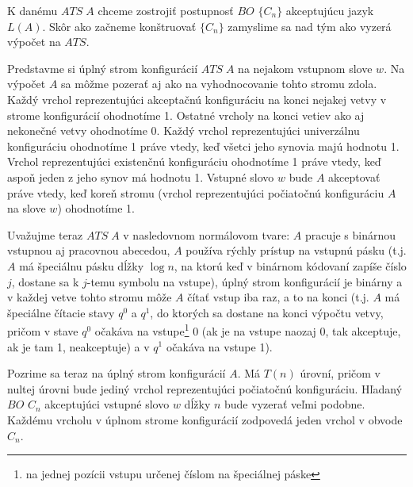 {\begin{dokaz}
  K danému $ATS\;A$ chceme zostrojiť postupnosť $BO$ $\{ C_n\}$
  akceptujúcu jazyk $L(A)$. Skôr ako začneme konštruovať $\{ C_n\}$
  zamyslime sa nad tým ako vyzerá výpočet na $ATS$.

  Predstavme si úplný strom konfigurácií $ATS\;A$ na nejakom
  vstupnom slove $w$. Na výpočet $A$ sa môžme pozerať aj ako na
  vyhodnocovanie tohto stromu zdola. Každý vrchol reprezentujúci
  akceptačnú konfiguráciu na konci nejakej vetvy v strome
  konfigurácií ohodnotíme 1. Ostatné vrcholy na konci vetiev ako aj
  nekonečné vetvy ohodnotíme 0. Každý vrchol reprezentujúci
  univerzálnu konfiguráciu ohodnotíme 1 práve vtedy, keď všetci jeho
  synovia majú hodnotu 1. Vrchol reprezentujúci existenčnú
  konfiguráciu ohodnotíme 1 práve vtedy, keď aspoň jeden z jeho
  synov má hodnotu 1. Vstupné slovo $w$ bude $A$ akceptovať práve
  vtedy, keď koreň stromu (vrchol reprezentujúci počiatočnú
  konfiguráciu $A$ na slove $w$) ohodnotíme 1.

  Uvažujme teraz $ATS\;A$ v nasledovnom normálovom tvare:\newline
  $A$ pracuje s binárnou vstupnou aj pracovnou abecedou, $A$ používa
  rýchly prístup na vstupnú pásku (t.j. $A$ má špeciálnu pásku dĺžky
  $\log n$, na ktorú keď v binárnom kódovaní zapíše číslo $j$,
  dostane sa k $j$-temu symbolu na vstupe), úplný strom konfigurácií
  je binárny a v každej vetve tohto stromu môže $A$ čítať vstup iba
  raz, a to na konci (t.j. $A$ má špeciálne čítacie stavy $q^0$ a
  $q^1$, do ktorých sa dostane na konci výpočtu vetvy, pričom v
  stave $q^0$ očakáva na vstupe\footnote{na jednej pozícii vstupu
  určenej číslom na špeciálnej páske} 0 (ak je na vstupe naozaj 0,
  tak akceptuje, ak je tam 1, neakceptuje) a v $q^1$ očakáva na
  vstupe 1).

  Pozrime sa teraz na úplný strom konfigurácií $A$. Má $T(n)$
  úrovní, pričom v nultej úrovni bude jediný vrchol reprezentujúci
  počiatočnú konfiguráciu. Hľadaný $BO$ $C_n$ akceptujúci vstupné
  slovo $w$ dĺžky $n$ bude vyzerať veľmi podobne. Každému vrcholu v
  úplnom strome konfigurácií zodpovedá jeden vrchol v obvode $C_n$.


\end{dokaz}}

